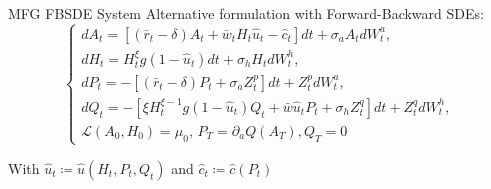 \documentclass[xcolor=dvipsnames,t,aspectratio=170]{beamer} %
\begin{document}
\begin{frame}{MFG FBSDE System}
Alternative formulation with Forward-Backward SDEs:
\begin{equation}
    \begin{cases}
        d A_t = \left[ (\bar r_t - \delta) A_t + \bar w_t H_t {\hat u}_t - {\hat c}_t  \right] dt + \sigma_a A_t d W^a_t,\\
        d H_t = H^\xi_t g(1 - {\hat u}_t) dt + \sigma_h H_t d W^h_t,\\
        d P_t = -\left[ (\bar r_t - \delta) P_t + \sigma_a Z^p_t \right]dt + Z^p_t d W^a_t,\\
        d Q_t = - \left[ \xi H_t^{\xi - 1} g(1 - {\hat u}_t ) Q_t + {\bar w} {\hat u}_t P_t + \sigma_h Z^q_t \right] dt + Z^q_t d W^h_t,\\
        \mathcal{L}(A_0, H_0) = \mu_0, \, P_T = \partial_a Q(A_T), Q_T = 0
    \end{cases}
\end{equation}

With $\hat u_t \coloneqq \hat u(H_t,P_t,Q_t)$ and $\hat c_t \coloneqq \hat c(P_t)$
\end{frame}
\end{document}
